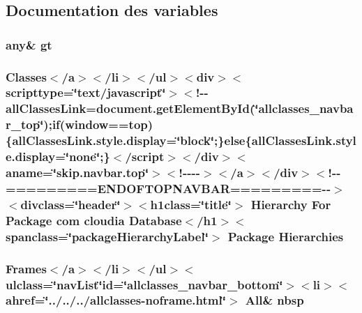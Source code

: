 \subsection{Documentation des variables}
\hypertarget{com_2cloudia_2_database_2package-tree_8html_a1bb4447113f0bd7bf49e2b3dee2e065d}{
\subsubsection[{gt}]{\setlength{\rightskip}{0pt plus 5cm}any\& gt}}\label{com_2cloudia_2_database_2package-tree_8html_a1bb4447113f0bd7bf49e2b3dee2e065d}
\hypertarget{com_2cloudia_2_database_2package-tree_8html_a7fef6f0e61c58495f3c88b858dc5995b}{
\subsubsection[{Hierarchies}]{\setlength{\rightskip}{0pt plus 5cm}Classes$<$/{\bf a}$>$$<$/li$>$$<$/ul$>$$<$div$>$$<$scripttype=\char`\"{}text/javascript\char`\"{}$>$$<$!-\/-\/all\-Classes\-Link=document.\-get\-Element\-By\-Id(\char`\"{}allclasses\-\_\-navbar\-\_\-top\char`\"{});if(window==top)\{all\-Classes\-Link.\-style.\-display=\char`\"{}block\char`\"{};\}else\{all\-Classes\-Link.\-style.\-display=\char`\"{}none\char`\"{};\}$<$/script$>$$<$/div$>$$<$aname=\char`\"{}skip.\-navbar.\-top\char`\"{}$>$$<$!-\/-\/-\/-\/$>$$<$/a$>$$<$/div$>$$<$!-\/-\/=========E\-N\-D\-O\-F\-T\-O\-P\-N\-A\-V\-B\-A\-R=========-\/-\/$>$$<$divclass=\char`\"{}header\char`\"{}$>$$<$h1class=\char`\"{}title\char`\"{}$>$ Hierarchy For Package com cloudia Database$<$/h1$>$$<$spanclass=\char`\"{}package\-Hierarchy\-Label\char`\"{}$>$ Package Hierarchies}}\label{com_2cloudia_2_database_2package-tree_8html_a7fef6f0e61c58495f3c88b858dc5995b}
\hypertarget{com_2cloudia_2_database_2package-tree_8html_aff329d23a24e17d925e4078265e1c7cf}{
\subsubsection[{nbsp}]{\setlength{\rightskip}{0pt plus 5cm}Frames$<$/{\bf a}$>$$<$/li$>$$<$/ul$>$$<$ulclass=\char`\"{}nav\-List\char`\"{}id=\char`\"{}allclasses\-\_\-navbar\-\_\-bottom\char`\"{}$>$$<$li$>$$<$ahref=\char`\"{}../../../allclasses-\/noframe.\-html\char`\"{}$>$ All\& nbsp}}\label{com_2cloudia_2_database_2package-tree_8html_aff329d23a24e17d925e4078265e1c7cf}
